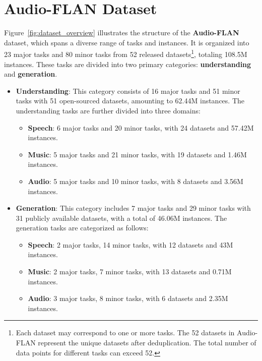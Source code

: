 



\section{Audio-FLAN Dataset}

Figure~\ref{fig:dataset_overview} illustrates the structure of the \textbf{Audio-FLAN} dataset, which spans a diverse range of tasks and instances. It is organized into 23 major tasks and 80 minor tasks from 52 released datasets\footnote{Each dataset may correspond to one or more tasks. The 52 datasets in Audio-FLAN represent the unique datasets after deduplication. The total number of data points for different tasks can exceed 52.}, totaling 108.5M instances. These tasks are divided into two primary categories: \textbf{understanding} and \textbf{generation}.

\begin{itemize}
    \item \textbf{Understanding}: This category consists of 16 major tasks and 51 minor tasks with 51 open-sourced datasets, amounting to 62.44M instances. The understanding tasks are further divided into three domains:
    \begin{itemize}
        \item \textbf{Speech}: 6 major tasks and 20 minor tasks, with 24 datasets and 57.42M instances.
        \item \textbf{Music}: 5 major tasks and 21 minor tasks, with 19 datasets and 1.46M instances.
        \item \textbf{Audio}: 5 major tasks and 10 minor tasks, with 8 datasets and 3.56M instances.
    \end{itemize}
    
    \item \textbf{Generation}: This category includes 7 major tasks and 29 minor tasks with 31 publicly available datasets, with a total of 46.06M instances. The generation tasks are categorized as follows:
    \begin{itemize}
        \item \textbf{Speech}: 2 major tasks, 14 minor tasks, with 12 datasets and 43M instances.
        \item \textbf{Music}: 2 major tasks, 7 minor tasks, with 13 datasets and 0.71M instances.
        \item \textbf{Audio}: 3 major tasks, 8 minor tasks, with 6 datasets and 2.35M instances.
    \end{itemize}
\end{itemize}

